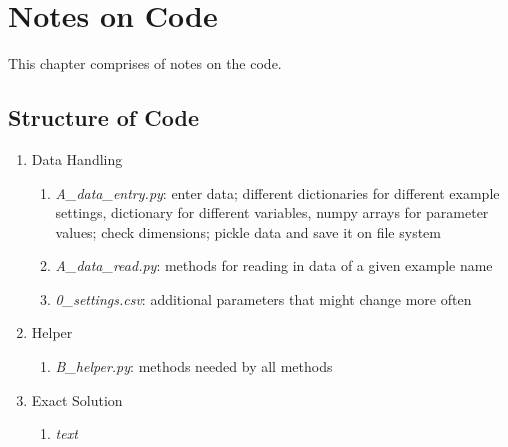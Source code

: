 \chapter{Notes on Code}

\clearpage
\setcounter{page}{1}
\noindent{}

This chapter comprises of notes on the code.

\section{Structure of Code}

\begin{enumerate}[noitemsep]
	\item Data Handling
	\begin{enumerate}[noitemsep]
		\item \emph{A\_data\_entry.py}: enter data; different dictionaries for different example settings, dictionary for different variables, numpy arrays for parameter values; check dimensions; pickle data and save it on file system
		\item \emph{A\_data\_read.py}: methods for reading in data of a given example name
		\item \emph{0\_settings.csv}: additional parameters that might change more often
	\end{enumerate}
	\item Helper
	\begin{enumerate}[noitemsep]
		\item \emph{B\_helper.py}: methods needed by all methods
	\end{enumerate}
	\item Exact Solution
	\begin{enumerate}[noitemsep]
		\item \emph{text}
	\end{enumerate}
\end{enumerate}